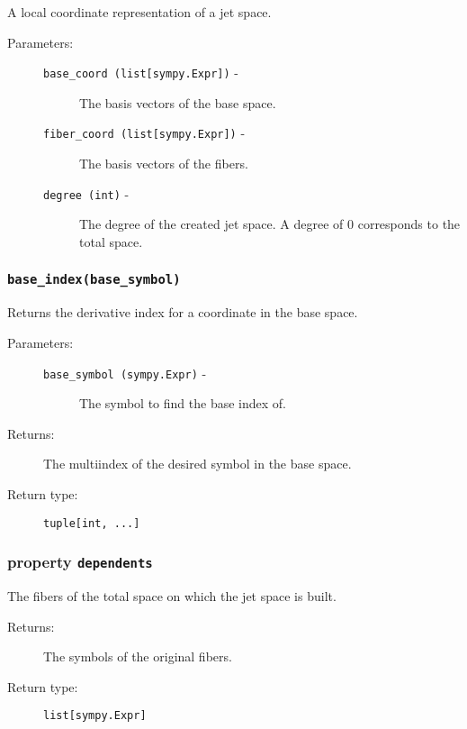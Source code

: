    A local coordinate representation of a jet space.

   \begin{description}
      \item[Parameters:] \leavevmode
        \begin{description}
            \item[\lstinline{base_coord (list[sympy.Expr])} -] The basis vectors of the base space.
            \item[\lstinline{fiber_coord (list[sympy.Expr])} -] The basis vectors of the fibers.
            \item[\lstinline{degree (int)} -] The degree of the created jet space. A degree of 0 corresponds to the total space.
        \end{description}     
   \end{description}

   \subsubsection*{\lstinline{base_index(base_symbol)}}

      Returns the derivative index for a coordinate in the base space.

      \begin{description}
         \item[Parameters:] \leavevmode
           \begin{description}
               \item[\lstinline{base_symbol (sympy.Expr)} -] The symbol to find the base index of.
           \end{description}
         \item[Returns:] The multiindex of the desired symbol in the base space.
         \item[Return type:] \lstinline{tuple[int, ...]} 
      \end{description}

   \subsubsection*{property \lstinline{dependents}}

      The fibers of the total space on which the jet space is built.

      \begin{description}
         \item[Returns:] The symbols of the original fibers.
         \item[Return type:] \lstinline{list[sympy.Expr]}
      \end{description}
   
